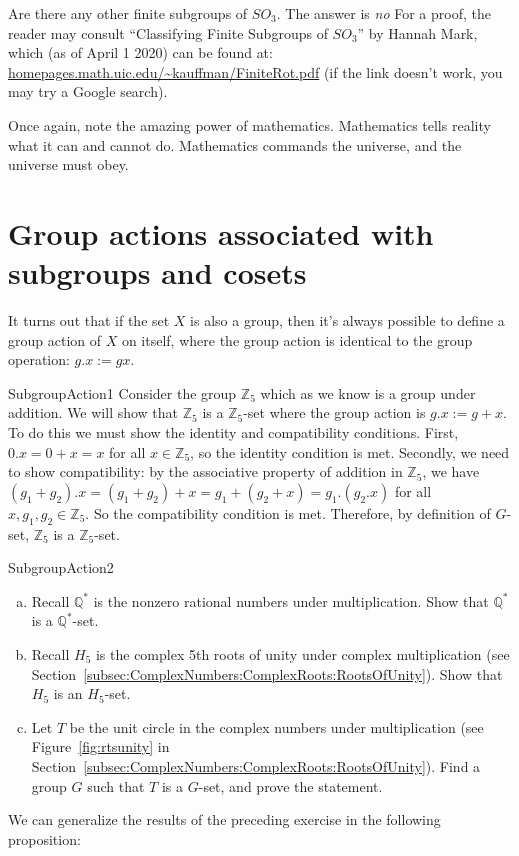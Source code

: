 Are there any other finite subgroups of $SO_3$.  The answer is \emph{no} For a proof, the reader may consult ``Classifying Finite Subgroups of $SO_3$'' by Hannah Mark, which (as of April 1 2020) can be found at: \url{homepages.math.uic.edu/~kauffman/FiniteRot.pdf}  (if the link doesn't work, you may try a Google search).

Once again, note the amazing power of mathematics. Mathematics tells reality what it can and cannot do. Mathematics commands the universe, and the universe must obey. 


\section{Group actions associated with subgroups and cosets}
\label{sec:GroupActions:SubgroupsAndCosets}

It turns out that if the set $X$ is also a group, then it's always possible to define a group action of $X$ on itself, where the group action is identical to the group operation: $g.x:=gx$.

\begin{example}{SubgroupAction1}
Consider the group $\mathbb{Z}_5$ which as we know is a group under addition. We will show that $\mathbb{Z}_5$ is a $\mathbb{Z}_5$-set where the group action is $g.x := g+x$. To do this we must show the identity and compatibility conditions. First, $0.x = 0+x = x$ for all $x \in\mathbb {Z}_5$, so the identity condition is met.  Secondly, we need to show compatibility: by the associative property of addition in $\mathbb {Z}_5$, we have $(g_1+g_2).x = (g_1+g_2)+x  = g_1+(g_2+x) = g_1.(g_2.x)$ for all $x, g_1,g_2 \in\mathbb{ Z}_5$. So the compatibility condition is met.  Therefore, by definition of $G$-set, $\mathbb{Z}_5$ is a $\mathbb{Z}_5$-set.
\end {example}

\begin{exercise}{SubgroupAction2}
\begin{enumerate} [(a)]
\item Recall $\mathbb{ Q}^* $ is the nonzero rational numbers under multiplication. Show that $\mathbb{ Q}^* $ is a $\mathbb{ Q}^* $-set.
\item Recall $H_5$ is the complex 5th roots of unity under complex multiplication (see Section~\ref{subsec:ComplexNumbers:ComplexRoots:RootsOfUnity}). Show that $H_5$ is an $H_5$-set.
\item Let $T$ be the unit circle in the complex numbers under multiplication (see Figure~\ref{fig:rtsunity} in Section~\ref{subsec:ComplexNumbers:ComplexRoots:RootsOfUnity}).  Find a group $G$ such that $T$ is a $G$-set, and prove the statement.
\end{enumerate}
\end {exercise}
We can generalize the results of the preceding exercise in the following proposition:

